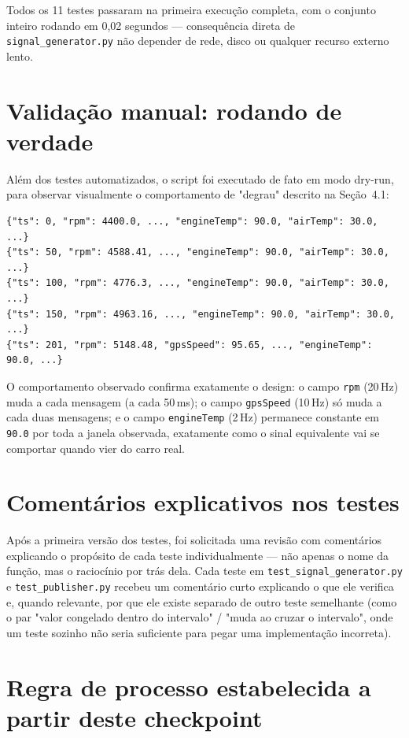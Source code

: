 \documentclass[11pt,a4paper]{article}
\begin{document}
Todos os 11 testes passaram na primeira execução completa, com o conjunto inteiro rodando em 0,02 segundos --- consequência direta de \texttt{signal\_generator.py} não depender de rede, disco ou qualquer recurso externo lento.

\section{Validação manual: rodando de verdade}

Além dos testes automatizados, o script foi executado de fato em modo dry-run, para observar visualmente o comportamento de "degrau" descrito na Seção~4.1:

\begin{lstlisting}[caption={Saída real de \texttt{python -m mock\_publisher --dry-run}}]
{"ts": 0, "rpm": 4400.0, ..., "engineTemp": 90.0, "airTemp": 30.0, ...}
{"ts": 50, "rpm": 4588.41, ..., "engineTemp": 90.0, "airTemp": 30.0, ...}
{"ts": 100, "rpm": 4776.3, ..., "engineTemp": 90.0, "airTemp": 30.0, ...}
{"ts": 150, "rpm": 4963.16, ..., "engineTemp": 90.0, "airTemp": 30.0, ...}
{"ts": 201, "rpm": 5148.48, "gpsSpeed": 95.65, ..., "engineTemp": 90.0, ...}
\end{lstlisting}

O comportamento observado confirma exatamente o design: o campo \texttt{rpm} (20\,Hz) muda a cada mensagem (a cada 50\,ms); o campo \texttt{gpsSpeed} (10\,Hz) só muda a cada duas mensagens; e o campo \texttt{engineTemp} (2\,Hz) permanece constante em \texttt{90.0} por toda a janela observada, exatamente como o sinal equivalente vai se comportar quando vier do carro real.

\section{Comentários explicativos nos testes}

Após a primeira versão dos testes, foi solicitada uma revisão com comentários explicando o propósito de cada teste individualmente --- não apenas o nome da função, mas o raciocínio por trás dela. Cada teste em \texttt{test\_signal\_generator.py} e \texttt{test\_publisher.py} recebeu um comentário curto explicando o que ele verifica e, quando relevante, por que ele existe separado de outro teste semelhante (como o par "valor congelado dentro do intervalo" / "muda ao cruzar o intervalo", onde um teste sozinho não seria suficiente para pegar uma implementação incorreta).

\section{Regra de processo estabelecida a partir deste checkpoint}
\label{sec:regra-testes}
\end{document}
